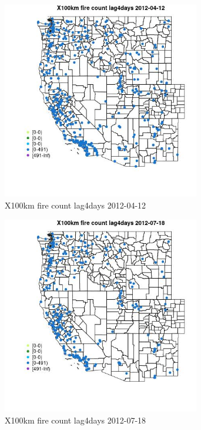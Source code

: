 \begin{figure} 
\centering  
\includegraphics[width=0.77\textwidth]{Code_Outputs/Report_ML_input_PM25_Step4_part_e_de_duplicated_aves_compiled_2019-05-14wNAs_MapObsX100km_fire_count_lag4days2012-04-12.jpg} 
\caption{\label{fig:Report_ML_input_PM25_Step4_part_e_de_duplicated_aves_compiled_2019-05-14wNAsMapObsX100km_fire_count_lag4days2012-04-12}X100km fire count lag4days 2012-04-12} 
\end{figure} 
 

\begin{figure} 
\centering  
\includegraphics[width=0.77\textwidth]{Code_Outputs/Report_ML_input_PM25_Step4_part_e_de_duplicated_aves_compiled_2019-05-14wNAs_MapObsX100km_fire_count_lag4days2012-07-18.jpg} 
\caption{\label{fig:Report_ML_input_PM25_Step4_part_e_de_duplicated_aves_compiled_2019-05-14wNAsMapObsX100km_fire_count_lag4days2012-07-18}X100km fire count lag4days 2012-07-18} 
\end{figure} 
 


